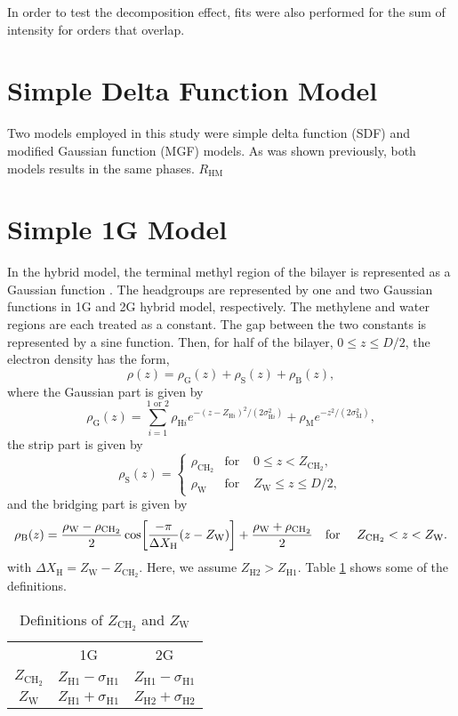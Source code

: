 \documentclass[12pt,letterpaper]{article}
\newcommand{\zh}[1]{Z_{\mathrm{H}#1}}
\newcommand{\zw}{Z_\mathrm{W}}
\newcommand{\zchtwo}{Z_\mathrm{CH_2}}
\newcommand{\sigmah}[1]{\sigma_{\mathrm{H}#1}}
\newcommand{\sigmam}{\sigma_\mathrm{M}}
\newcommand{\rhoh}[1]{\rho_{\mathrm{H}#1}}
\newcommand{\rhom}{\rho_\mathrm{M}}
\newcommand{\rhog}{\rho_\mathrm{G}}
\newcommand{\rhos}{\rho_\mathrm{S}}
\newcommand{\rhob}{\rho_\mathrm{B}}
\newcommand{\rhow}{\rho_\mathrm{W}}
\newcommand{\rhochtwo}{\rho_\mathrm{CH_2}}
\newcommand{\deltaxh}{\Delta X_\mathrm{H}}
\newcommand{\rhm}[1]{R_{\mathrm{H}#1\mathrm{M}}}
\begin{document}
In order to test the decomposition effect, fits were also performed
for the sum of intensity for orders that overlap. 

\section{Simple Delta Function Model}
Two models employed in this study were simple delta function (SDF) and
modified Gaussian function (MGF) models. As was shown previously,
both models results in the same phases. $\rhm{}$

\section{Simple 1G Model}
In the hybrid model, the terminal methyl region of the bilayer is represented
as a Gaussian function \cite{ref:Wiener89}. The headgroups are represented by one 
and two Gaussian
functions in 1G and 2G hybrid model, respectively. The methylene and water 
regions are each treated as a constant. The gap between the two constants is 
represented by a sine function. Then, for half of the bilayer, 
$0 \leq z \leq D/2$, the electron density has the form, 
\begin{equation}
  \rho(z) = \rhog(z) + \rhos(z) + \rhob(z),
\end{equation}
where the Gaussian part is given by 
\begin{equation}
  \rhog(z) = \sum_{i=1}^{1\text{ or }2} \rhoh{i}
             e^{-(z-\zh{i})^2/(2\sigmah{i}^2)} + \rhom e^{-z^2/(2\sigmam^2)},
\end{equation}
the strip part is given by
\begin{equation}
  \rhos(z) = \left\{
    \begin{array}{ccc}
      \rhochtwo & \text{for } & 0 \leq z < \zchtwo, \\
      \rhow   & \text{for } & \zw \leq z \leq D/2,
    \end{array}
  \right.
\end{equation}
and the bridging part is given by
\begin{equation}
  \rhob(z) = \frac{\rhow-\rhochtwo}{2} \cos \bracks{
    \frac{-\pi}{\deltaxh}(z-\zw)} + \frac{\rhow+\rhochtwo}{2} \\
  \text{\quad for \quad} \zchtwo < z < \zw.
\end{equation}
with $\deltaxh=\zw-\zchtwo$. Here, we assume $\zh{2}>\zh{1}$. 
Table \ref{tb:zchtwozw} shows some of the definitions.

\begin{table}[htb]
  \centering
  \begin{tabular}{c c c}
     & 1G & 2G \\
    $\zchtwo$ & $\zh{1}-\sigmah{1}$ & $\zh{1}-\sigmah{1}$ \\
    $\zw$ & $\zh{1}+\sigmah{1}$ & $\zh{2}+\sigmah{2}$   
  \end{tabular}
  \caption{Definitions of $\zchtwo$ and $\zw$}
  \label{tb:zchtwozw}
\end{table}
\end{document}
